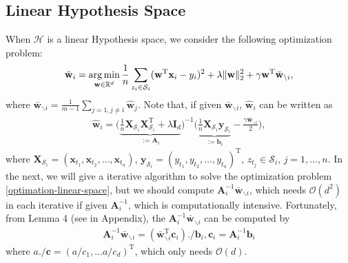 \documentclass{article}
\newcommand{\argmin}{\operatornamewithlimits{arg\,min}}
\begin{document}
\subsection{Linear Hypothesis Space}
When $\mathcal{H}$ is a linear Hypothesis space,
we consider the following optimization problem:
\begin{align}
 \label{optimation-linear-space}
  \hat{\mathbf w}_i=\argmin_{\mathbf w\in\mathbb{R}^d}
  \frac{1}{n}\sum_{z_i\in\mathcal{S}_i}(\mathbf w^\mathrm{T}\mathbf x_i-y_i)^2+\lambda \|\mathbf w\|_2^2+ \gamma \mathbf w^\mathrm{T}\bar{\mathbf w}_{\backslash i},
\end{align}
where $\bar{\mathbf w}_{\backslash i}=\frac{1}{m-1}\sum_{j=1,j\not =i}\hat{\mathbf w}_j$.
Note that, if given $\bar{\mathbf w}_{\backslash i}$,  $\hat{\mathbf w}_i$ can be written as
\begin{align*}
  \hat{\mathbf w}_i=\Big(\underbrace{\frac{1}{n}\mathbf X_{\mathcal{S}_i}\mathbf X_{\mathcal{S}_i}^\mathrm{T}+\lambda \mathbf I_d}_{:=\mathbf A_i}\Big)^{-1}
  \Big(\underbrace{\frac{1}{n}\mathbf X_{\mathcal{S}_i}\mathbf y_{\mathcal{S}_i}}_{:=\mathbf b_i}- \frac{\gamma\bar{\mathbf w}_{\backslash i}}{2}\Big),
\end{align*}
where $\mathbf X_{\mathcal{S}_i}=(\mathbf x_{t_1},\mathbf x_{t_2},\ldots, \mathbf x_{t_n})$,
$\mathbf y_{\mathcal{S}_i}=(y_{t_1},y_{t_2},\ldots,y_{t_n})^\mathrm{T}$, $z_{t_j}\in \mathcal{S}_i$, $j=1,\ldots, n$.
In the next, we will give a iterative algorithm to
solve the optimization problem \eqref{optimation-linear-space},
but  we should compute $\mathbf A_i^{-1}\bar{\mathbf w}_{\backslash i}$, which needs $\mathcal{O}\left(d^2\right)$
in each iterative if given $\mathbf A_i^{-1}$,
which is computationally intensive.
Fortunately, %
from Lemma 4  (see in Appendix), the $\mathbf A_i^{-1}\bar{\mathbf w}_{\backslash i}$ can be computed by
\begin{align*}
  \mathbf A_i^{-1}\bar{\mathbf w}_{\backslash i}=
  \left(\bar{\mathbf w}_{\backslash i}^\mathrm{T}\mathbf c_i\right)./\mathbf b_i, \mathbf c_i=\mathbf A_i^{-1}\mathbf b_i
\end{align*}
where $a./\mathbf c=(a/c_1,\ldots a/c_d)^\mathrm{T}$, which only needs $\mathcal{O}(d)$.
\end{document}
